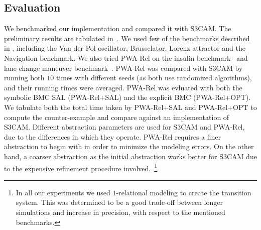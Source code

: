 

\subsection{Evaluation}

We benchmarked our implementation and compared it with S3CAM.  The
preliminary results are tabulated in~. We used few of
the benchmarks described in \cite{zutshi2014multiple}, including the
Van der Pol oscillator, Brusselator, Lorenz attractor and the
Navigation benchmark. We also tried PWA-Rel on the insulin
benchmark~\cite{chenformal} and lane change maneuver
benchmark~\cite{althoff2012reachability}. PWA-Rel was compared with
S3CAM by running both $10$ times with different seeds (as both use
randomized algorithms), and their running times were averaged. PWA-Rel
was evluated with both the symbolic BMC SAL (PWA-Rel+SAL) and the
explicit BMC (PWA-Rel+OPT). %
We
tabulate both the total time taken by PWA-Rel+SAL and PWA-Rel+OPT to
compute the counter-example and compare against an implementation of
S3CAM.  Different abstraction parameters are used for S3CAM and
PWA-Rel, due to the differences in which they operate. PWA-Rel
requires a finer abstraction to begin with in order to minimize the
modeling errors. On the other hand, a coarser abstraction as the
initial abstraction works better for S3CAM due to the expensive
refinement procedure involved.~\footnote{In all our experiments we
used $1$-relational modeling to create the transition system.
This was determined to be a good trade-off between longer simulations
and increase in precision, with respect to the mentioned benchmarks.}

